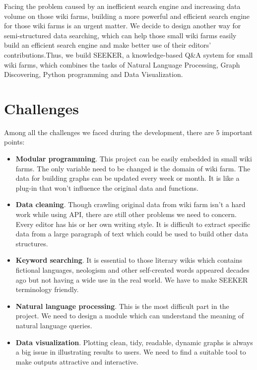 \indent Facing the problem caused by an inefficient search engine and increasing data volume on those wiki farms, building a more powerful and efficient search engine for those wiki farms is an urgent matter. We decide to design another way for semi-structured data searching, which can help those small wiki farms easily build an efficient search engine and make better use of their editors' contributions.Thus, we build SEEKER, a knowledge-based Q\&A system for small wiki farms, which combines the tasks of Natural Language Processing, Graph Discovering, Python programming and Data Visualization. 

\section{Challenges}
\vspace{-5pt}
\noindent Among all the challenges we faced during the development, there are 5 important points:
\begin{itemize}
	\item \textbf{Modular programming}. This project can be easily embedded in small wiki farms. The only variable need to be changed is the domain of wiki farm. The data for building graphs can be updated every week or month. It is like a plug-in that won't influence the original data and functions.
	\item \textbf{Data cleaning}. Though crawling original data from wiki farm isn't a hard work while using API, there are still other problems we need to concern. Every editor has his or her own writing style. It is difficult to extract specific data from a large paragraph of text which could be used to build other data structures.
	\item \textbf{Keyword searching}. It is essential to those literary wikis which contains fictional languages, neologism and other self-created words appeared decades ago but not having a wide use in the real world. We have to make SEEKER terminology friendly.
	\item \textbf{Natural language processing}. This is the most difficult part in the project. We need to design a module which can understand the meaning of natural language queries.
	\item \textbf{Data visualization}. Plotting clean, tidy, readable, dynamic graphs is always a big issue in illustrating results to users. We need to find a suitable tool to make outputs attractive and interactive.
\end{itemize}


